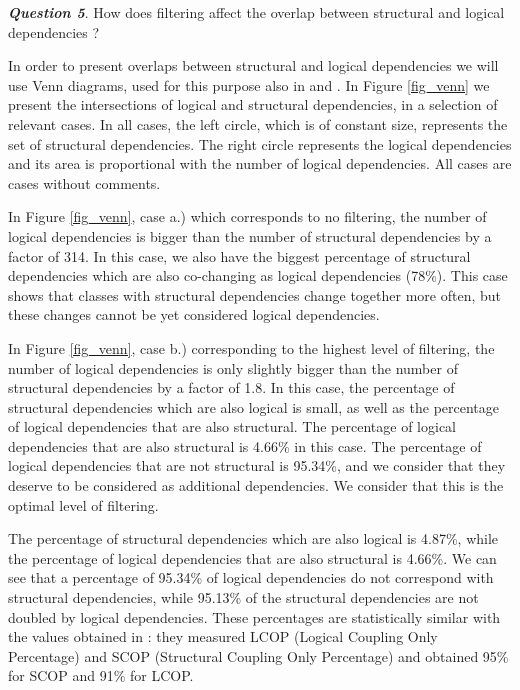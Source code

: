 \documentclass[a4paper,twoside]{article}
\begin{document}
\textit{\textbf{Question 5}}. How does filtering affect the overlap between structural and logical dependencies ? 

In order to present overlaps between structural and logical dependencies we will use Venn diagrams, used for this purpose also in \cite{Oliva:2011:ISL:2067853.2068086} and \cite{DBLP:journals/jss/AjienkaC17}. In Figure \ref{fig_venn} we present the intersections of logical and structural dependencies, in a selection of relevant cases. In all cases, the left circle, which is of constant size, represents the set of structural dependencies. The right circle represents the logical dependencies and its area is proportional with the number of logical dependencies. All cases are cases without comments.

In Figure \ref{fig_venn}, case a.) which corresponds to no filtering, the number of logical dependencies is bigger than the number of structural dependencies by a factor of 314. In this case, we also have the biggest percentage of structural dependencies which are also co-changing as logical dependencies (78\%). This case shows that classes with structural dependencies change together more often, but these changes cannot be yet considered logical dependencies.

In Figure \ref{fig_venn}, case b.) corresponding to the highest level of filtering, the number of logical dependencies is only slightly bigger than the number of structural dependencies by a factor of 1.8. In this case, the percentage of structural dependencies which are also logical is small, as well as the percentage of logical dependencies that are also structural.  The percentage of logical dependencies that are also structural is 4.66\% in this case. The percentage of logical dependencies that are not structural is 95.34\%, and we consider that they deserve to be considered as additional dependencies.
We consider that this is the optimal level of filtering. 

The percentage of structural dependencies which are also logical is 4.87\%,  while the percentage of logical dependencies that are also structural is 4.66\%. We can see that a percentage of 95.34\% of logical dependencies do not correspond with  structural dependencies, while 95.13\% of the structural dependencies are not doubled by logical dependencies. These percentages are statistically similar with the values obtained in \cite{Oliva:2011:ISL:2067853.2068086}: they measured LCOP (Logical Coupling Only Percentage)  and SCOP (Structural Coupling Only Percentage) and obtained 95\% for SCOP and 91\% for LCOP. 
\end{document}
